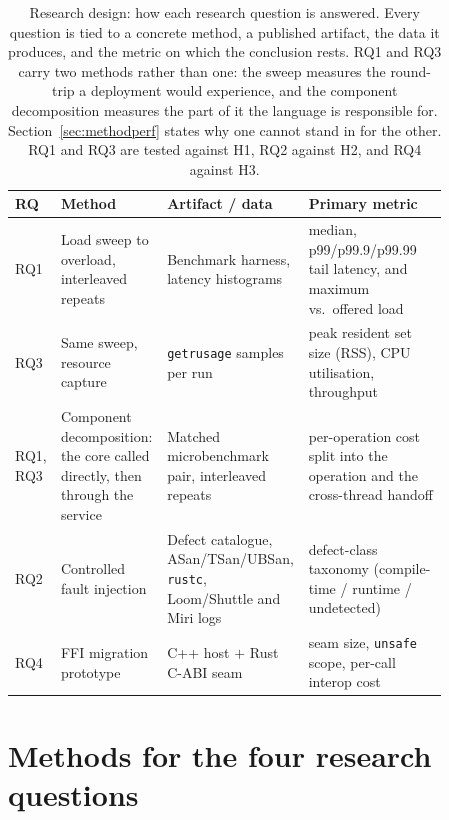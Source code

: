 \begin{table}[H]
\centering
\caption[Research design: how each research question is answered]{Research design: how each research question is answered. Every question is tied to a
concrete method, a published artifact, the data it produces, and the metric on which the
conclusion rests. RQ1 and RQ3 carry two methods rather than one: the sweep measures the
round-trip a deployment would experience, and the component decomposition measures the part of
it the language is responsible for. Section~\ref{sec:methodperf} states why one cannot stand in
for the other. RQ1 and RQ3 are tested against H1, RQ2 against H2, and RQ4 against
H3.\label{tab:design}}
\renewcommand{\arraystretch}{1.25}
\begin{tabular}{@{}p{0.06\linewidth} p{0.24\linewidth} p{0.24\linewidth} p{0.32\linewidth}@{}}
\hline\hline
RQ & Method & Artifact / data & Primary metric \\
\hline
RQ1 & Load sweep to overload, interleaved repeats & Benchmark harness, latency histograms &
median, p99/p99.9/p99.99 tail latency, and maximum vs.\ offered load \\
RQ3 & Same sweep, resource capture & \texttt{getrusage} samples per run &
peak resident set size (RSS), CPU utilisation, throughput \\
RQ1, RQ3 & Component decomposition: the core called directly, then through the service &
Matched microbenchmark pair, interleaved repeats &
per-operation cost split into the operation and the cross-thread handoff \\
RQ2 & Controlled fault injection & Defect catalogue, ASan/TSan/UBSan, \texttt{rustc},
Loom/Shuttle and Miri logs &
defect-class taxonomy (compile-time / runtime / undetected) \\
RQ4 & FFI migration prototype & C++ host $+$ Rust C-ABI seam &
seam size, \texttt{unsafe} scope, per-call interop cost \\
\hline
\end{tabular}
\end{table}

\section{Methods for the four research questions}

